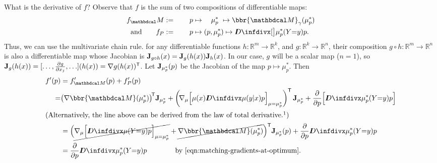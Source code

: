 \begin{lproof}
    What is the derivative of $f$?
    Observe that $f$ is the sum of two compositions of differentiable maps:
    \begin{align*}
        f_\dg M &:= \qquad
            p \mapsto ~~~\mu^*_p~ \mapsto  \bbr{\dg M}_\gamma(\mu^*_p) \\
        \text{and}\qquad
        f_{\Pr} &:= \qquad
        p \mapsto (p, \mu^*_p) \mapsto\kldiv[\big]{\mu^*_p(Y{=}y)}{p}.
    \end{align*}
    Thus, we can use the multivariate chain rule.
    for any differentiable functions $h : \mathbb R^m \to \mathbb R^k$,
    and $g : \mathbb R^k \to \mathbb R^n$, their composition $g \circ h : \mathbb R^m \to \mathbb R^n$ is also a differentiable map whose Jacobian is
     $\mathbf J_{g \circ h}(x) = \mathbf J_{g}(h(x)) \mathbf J_{h}(x)$.
    In our case, $g$ will be a scalar map ($n=1$), so $\mathbf J_g(h(x)) = [ \ldots, \frac{\partial g}{\partial x_j}, \ldots] (h(x)) = \nabla g(h(x))^{\sf T}$.
    Let $\mathbf J_{\mu^*_p}(p)$ be the Jacobian of the map $p \mapsto \mu^*_p$.
    Then
    \begin{align*}
        f'(p) &= f'_{\dg M}(p) + f'_{\Pr}(p) \\
        =& \big(\nabla \bbr{\dg M}(\mu^*_p)\big)^{\!\sf T} \mat J_{\mu^*_p}
            + \left(\!\nabla_\mu
                \Big[ \mu(x) \kldiv{\mu(y|x)}{p}\Big]_{\mu = \mu^*_p} \right)^{\sf T} \mat J_{\mu^*_p} +
                \frac{\partial}{\partial p} \Big[ \kldiv{\mu^*_p(Y{=}y)}{p}\Big] \\
\shortintertext{\centering
    (Alternatively, the line above can be derived from the law of total
    derivative.\footnotemark)
}
        &= \Big( \Cancel{\nabla_\mu
            \Big[ \kldiv{\mu(Y{=}y)}{p}\Big]_{\mu = \mu^*_p}
            } + \Cancel{\nabla \bbr{\dg M}(\mu^*_p)} \Big)^{\sf T}
            \mat J_{\mu^*_p}(p)
            + \frac{\partial}{\partial p} \kldiv{\mu^*_p(Y{=}y)}{p}
            \\
        &= \frac{\partial}{\partial p} \kldiv{\mu^*_p(Y{=}y)}{p}
        \qquad\qquad\text{by \eqref{eqn:matching-gradients-at-optimum}}.
    \end{align*}


\end{lproof}
